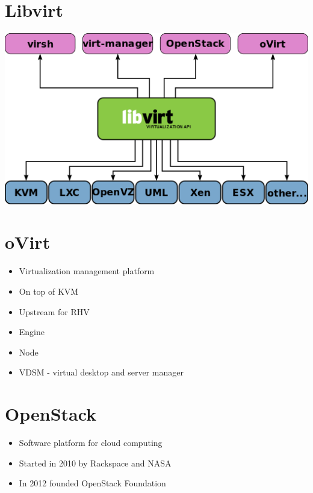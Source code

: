 \documentclass[11pt]{article}
\begin{document}
\section*{Libvirt}
\label{sec:org6a086e2}
\begin{center}
\includegraphics[width=.9\linewidth]{./libvirt.png}
\end{center}

\section*{oVirt}
\label{sec:org1bc842c}
\begin{itemize}
\item Virtualization management platform
\item On top of KVM
\item Upstream for RHV
\item Engine
\item Node
\item VDSM - virtual desktop and server manager
\end{itemize}

\section*{OpenStack}
\label{sec:org74387cc}
\begin{itemize}
\item Software platform for cloud computing
\item Started in 2010 by Rackspace and NASA
\item In 2012 founded OpenStack Foundation
\end{itemize}
\end{document}
